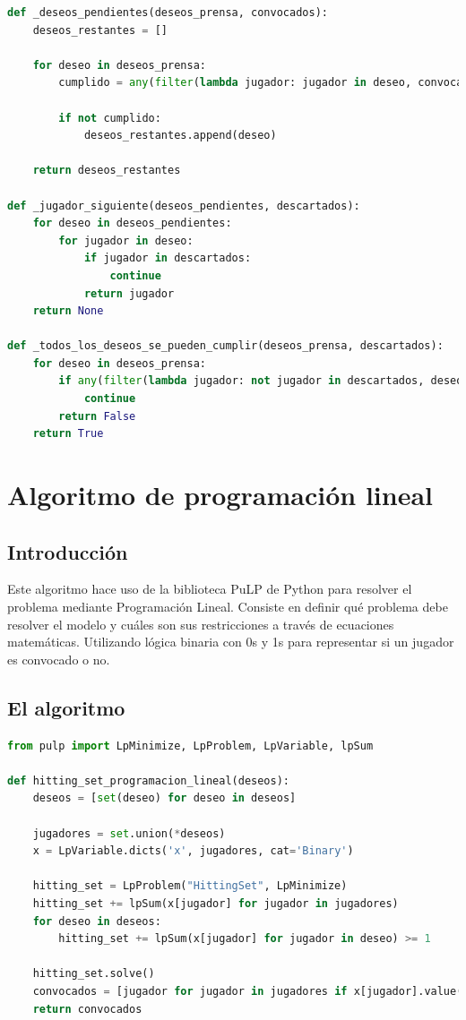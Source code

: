 \documentclass{estilo}
\begin{document}
\begin{lstlisting}[language=Python]
def _deseos_pendientes(deseos_prensa, convocados):
    deseos_restantes = []

    for deseo in deseos_prensa:
        cumplido = any(filter(lambda jugador: jugador in deseo, convocados))
        
        if not cumplido:
            deseos_restantes.append(deseo)
    
    return deseos_restantes

def _jugador_siguiente(deseos_pendientes, descartados):
    for deseo in deseos_pendientes:
        for jugador in deseo:
            if jugador in descartados:
                continue
            return jugador
    return None
    
def _todos_los_deseos_se_pueden_cumplir(deseos_prensa, descartados):
    for deseo in deseos_prensa:
        if any(filter(lambda jugador: not jugador in descartados, deseo)):
            continue
        return False
    return True

\end{lstlisting}

\newpage
\section{Algoritmo de programación lineal}

\subsection{Introducción}

Este algoritmo hace uso de la biblioteca PuLP de Python para resolver el problema mediante Programación Lineal. Consiste en definir qué problema debe resolver el modelo y cuáles son sus restricciones a través de ecuaciones matemáticas. Utilizando lógica binaria con 0s y 1s para representar si un jugador es convocado o no.

\subsection{El algoritmo}

\begin{lstlisting}[language=Python]
from pulp import LpMinimize, LpProblem, LpVariable, lpSum

def hitting_set_programacion_lineal(deseos):
    deseos = [set(deseo) for deseo in deseos]

    jugadores = set.union(*deseos)
    x = LpVariable.dicts('x', jugadores, cat='Binary')
    
    hitting_set = LpProblem("HittingSet", LpMinimize)
    hitting_set += lpSum(x[jugador] for jugador in jugadores)
    for deseo in deseos:
        hitting_set += lpSum(x[jugador] for jugador in deseo) >= 1

    hitting_set.solve()
    convocados = [jugador for jugador in jugadores if x[jugador].value() == 1]
    return convocados
\end{lstlisting}
\end{document}
